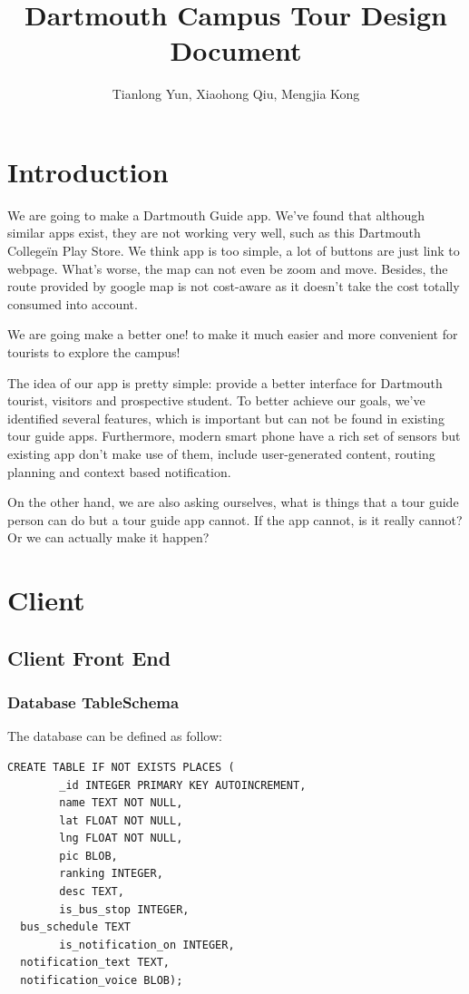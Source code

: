 \documentclass{article}
\title{Dartmouth Campus Tour Design Document}
\author{Tianlong Yun, Xiaohong Qiu, Mengjia Kong}
\begin{document}
\maketitle

\section{Introduction}

We are going to make a Dartmouth Guide app. We've found that although similar apps exist, they are not working very well, such as this \"Dartmouth College\" in Play Store. We think app is too simple, a lot of buttons are just link to webpage. What's worse, the map can not even be zoom and move. Besides, the route provided by google map is not cost-aware as it doesn't take the cost totally consumed into account.

We are going make a better one! to make it much easier and more convenient for tourists to explore the campus!

The idea of our app is pretty simple: provide a better interface for Dartmouth tourist, visitors and prospective student. To better achieve our goals, we've identified several features, which is important but can not be found in existing tour guide apps. Furthermore, modern smart phone have a rich set of sensors but existing app don't make use of them, include user-generated content, routing planning and context based notification. 

On the other hand, we are also asking ourselves, what is things that a tour guide person can do but a tour guide app cannot. If the app cannot, is it really cannot? Or we can actually make it happen?

\section{Client}

\subsection{Client Front End}

\subsubsection{Database TableSchema}

The database can be defined as follow:

\begin{lstlisting}
CREATE TABLE IF NOT EXISTS PLACES (
        _id INTEGER PRIMARY KEY AUTOINCREMENT, 
        name TEXT NOT NULL, 
        lat FLOAT NOT NULL, 
        lng FLOAT NOT NULL, 
        pic BLOB, 
        ranking INTEGER, 
        desc TEXT, 
        is_bus_stop INTEGER,
  bus_schedule TEXT
        is_notification_on INTEGER,
  notification_text TEXT,
  notification_voice BLOB);
\end{lstlisting}
\end{document}
